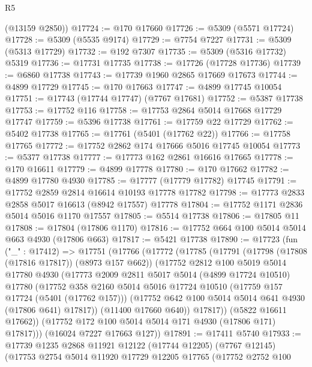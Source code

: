 \begin{lexlean}{R5}
\begin{coremodule}
      (@13159 @2850))
@17724 := @170 @17660
@17726 := @5309 (@5571 @17724)
@17728 := @5309 (@5535 @9174)
@17729 := @7754 @7227
@17731 := @5309 (@5313 @17729)
@17732 := @192 @7307
@17735 := @5309 (@5316 @17732) @5319
@17736 := @17731 @17735
@17738 := @17726 (@17728 @17736)
@17739 := @6860 @17738
@17743 := @17739 @1960 @2865 @17669 @17673
@17744 := @4899 @17729
@17745 := @170 @17663
@17747 := @4899 @17745 @10054
@17751 := @17743 (@17744 @17747) (@7767 @17681)
@17752 := @5387 @17738
@17753 := @17752 @116
@17758 := @17753 @2864 @5014 @17668 @17729 @17747
@17759 := @5396 @17738
@17761 := @17759 @22 @17729
@17762 := @5402 @17738
@17765 := @17761 (@5401 (@17762 @22))
@17766 := @17758 @17765
@17772 := @17752 @2862 @174 @17666 @5016 @17745 @10054
@17773 := @5377 @17738
@17777 := @17773 @162 @2861 @16616 @17665
@17778 := @170 @16611
@17779 := @4899 @17778
@17780 := @170 @17662
@17782 := @4899 @17780 @4930
@17785 := @17777 (@17779 @17782) @17745
@17791 := @17752 @2859 @2814 @16614 @10193 @17778 @17782
@17798 := @17773 @2833 @2858 @5017 @16613 (@8942 @17557) @17778
@17804 := @17752 @1171 @2836 @5014 @5016 @1170 @17557
@17805 := @5514 @17738
@17806 := @17805 @11
@17808 := @17804 (@17806 @1170)
@17816 := @17752 @664 @100 @5014 @5014 @663 @4930 (@17806 @663)
@17817 := @5421 @17738
@17890 := @17723
    (fun ("_" : @17412) =>
    @17751
      (@17766
        (@17772
          (@17785
            (@17791
              (@17798 (@17808 (@17816 @17817)) (@8973 @157 @662))
              (@17752
                @2812
                @100
                @5019
                @5014
                @17780
                @4930
                (@17773
                  @2009
                  @2811
                  @5017
                  @5014
                  (@4899 @17724 @10510)
                  @17780
                  (@17752
                    @358
                    @2160
                    @5014
                    @5016
                    @17724
                    @10510
                    (@17759 @157 @17724 (@5401 (@17762 @157)))
                    (@17752 @642 @100 @5014 @5014 @641 @4930 (@17806 @641) @17817))
                  (@11400 @17660 @640))
                @17817))
            (@5822 @16611 @17662))
          (@17752 @172 @100 @5014 @5014 @171 @4930 (@17806 @171) @17817)))
      (@16024 @7227 @17663 @127))
@17891 := @17411 @5740
@17933 := @17739
    @1235
    @2868
    @11921
    @12122
    (@17744 @12205)
    (@7767 @12145)
    (@17753
      @2754
      @5014
      @11920
      @17729
      @12205
      @17765
      (@17752
        @2752
        @100

\end{coremodule}
\end{lexlean}
